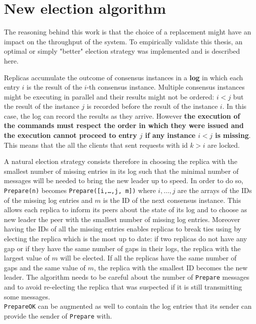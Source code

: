 \documentclass[a4paper, 10pt]{article}
\begin{document}
\section{New election algorithm}\label{newalg}
The reasoning behind this work is that the choice of a replacement might have an impact on the throughput of the system. To empirically validate this thesis, an optimal or simply "better" election strategy was implemented and is described here.

Replicas accumulate the outcome of consensus instances in a \textbf{log} in which each entry $i$ is the result of the $i$-th consensus instance. Multiple consensus instances might be executing in parallel and their results might not be ordered: $i < j$ but the result of the instance $j$ is recorded before the result of the instance $i$. In this case, the log can record the results as they arrive. However \textbf{the execution of the commands must respect the order in which they were issued and the execution cannot proceed to entry $j$ if any instance $i<j$ is missing}. This means that the all the clients that sent requests with id $k > i$ are locked.

A natural election strategy consists therefore in choosing the replica with the smallest number of missing entries in its log such that the minimal number of messages will be needed to bring the new leader up to speed.
In order to do so, \texttt{Prepare(n)} becomes \texttt{Prepare([i,\dots,j, m])} where $i,\dots,j$ are the arrays of the IDs of the missing log entries and $m$ is the ID of the next consensus instance. This allows each replica to inform its peers about the state of its log and to choose as new leader the peer with the smallest number of missing log entries. Moreover having the IDs of all the missing entries enables replicas to break ties using by electing the replica which is the most up to date: if two replicas do not have any gap or if they have the same number of gaps in their logs, the replica with the largest value of $m$ will be elected. If all the replicas have the same number of gaps and the same value of $m$, the replica with the smallest ID becomes the new leader. The algorithm needs to be careful about the number of \texttt{Prepare} messages and to avoid re-electing the replica that was suspected if it is still transmitting some messages.\\
\texttt{PrepareOK} can be augmented as well to contain the log entries that its sender can provide the sender of \texttt{Prepare} with.
\end{document}
